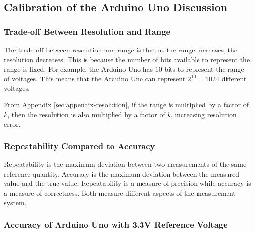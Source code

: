 \subsection{Calibration of the Arduino Uno Discussion}
\subsubsection{Trade-off Between Resolution and Range}
The trade-off between resolution and range is that as the range increases, the resolution decreases. This is because the number of bits
available to represent the range is fixed. For example, the Arduino Uno has 10 bits to represent the range of voltages. This means that the
Arduino Uno can represent $2^{10} = 1024$ different voltages. 

From Appendix \ref{sec:appendix-resolution}, if the range is multiplied by a factor of $k$, then the resolution is also multiplied by a factor of $k$, increasing resolution error.

\subsubsection{Repeatability Compared to Accuracy}
Repeatability is the maximum deviation between two measurements of the same reference quantity. Accuracy is the maximum deviation between the
measured value and the true value. Repeatability is a measure of precision while accuracy is a measure of correctness. Both measure different
aspects of the measurement system.

\subsubsection{Accuracy of Arduino Uno with 3.3V Reference Voltage}


